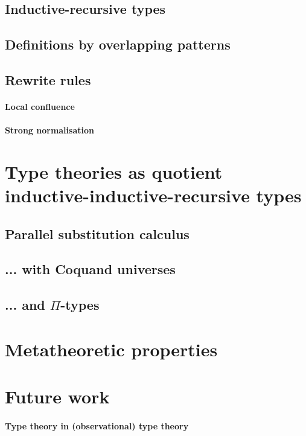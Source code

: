 \documentclass[a4paper,UKenglish,numberwithinsect,cleveref,thm-restate]{lipics-v2021}
\begin{document}
\subsection{Inductive-recursive types}
\cite{Dybjer2003,Dybjer2000,Dybjer1999}
\subsection{Definitions by overlapping patterns}
\cite{Cockx2014}
\subsection{Rewrite rules}
\cite{Cockx2020,Cockx2021}
\paragraph*{Local confluence}
\paragraph*{Strong normalisation}


\section{Type theories as quotient inductive-inductive-recursive types} \label{sec:QIIRTs}
\subsection{Parallel substitution calculus} \label{subsec:SC}
\subsection{... with Coquand universes} \label{subsec:SC+U}
\cite{Coquand2013}
\subsection{... and \texorpdfstring{$\Pi$}{Π}-types} \label{subsec:SC+U+Pi}

\section{Metatheoretic properties}

\section{Future work}

\paragraph*{Type theory in (observational) type theory}
\end{document}
